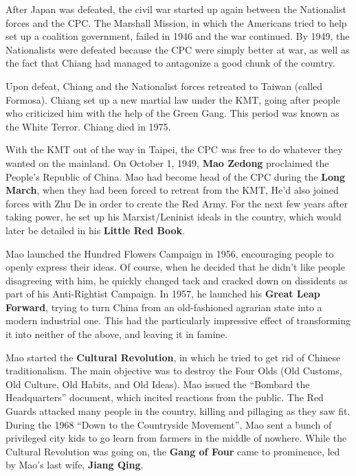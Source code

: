 After Japan was defeated, the civil war started up again between the Nationalist forces and the CPC\@.
The Marshall Mission, in which the Americans tried to help set up a coalition government,
failed in 1946 and the war continued.
By 1949, the Nationalists were defeated because the CPC were simply better at war,
as well as the fact that Chiang had managed to antagonize a good chunk of the country.

Upon defeat, Chiang and the Nationalist forces retreated to Taiwan (called Formosa).
Chiang set up a new martial law under the KMT,
going after people who criticized him with the help of the Green Gang.
This period was known as the White Terror.
Chiang died in 1975.

With the KMT out of the way in Taipei,
the CPC was free to do whatever they wanted on the mainland.
On October 1, 1949, \textbf{Mao Zedong} proclaimed the People's Republic of China.
Mao had become head of the CPC during the \textbf{Long March},
when they had been forced to retreat from the KMT\@,
He'd also joined forces with Zhu De in order to create the Red Army.
For the next few years after taking power, he set up his Marxist/Leninist ideals in the country,
which would later be detailed in his \textbf{Little Red Book}.

Mao launched the Hundred Flowers Campaign in 1956, encouraging people to openly express their ideas.
Of course, when he decided that he didn't like people disagreeing with him,
he quickly changed tack and cracked down on dissidents as part of his Anti-Rightist Campaign.
In 1957, he launched his \textbf{Great Leap Forward},
trying to turn China from an old-fashioned agrarian state into a modern industrial one.
This had the particularly impressive effect of transforming it into neither of the above, and leaving it in famine.

Mao started the \textbf{Cultural Revolution}, in which he tried to get rid of Chinese traditionalism.
The main objective was to destroy the Four Olds (Old Customs, Old Culture, Old Habits, and Old Ideas).
Mao issued the ``Bombard the Headquarters'' document, which incited reactions from the public.
The Red Guards attacked many people in the country, killing and pillaging as they saw fit.
During the 1968 ``Down to the Countryside Movement'',
Mao sent a bunch of privileged city kids to go learn from farmers in the middle of nowhere.
While the Cultural Revolution was going on, the \textbf{Gang of Four} came to prominence,
led by Mao's last wife, \textbf{Jiang Qing}.

